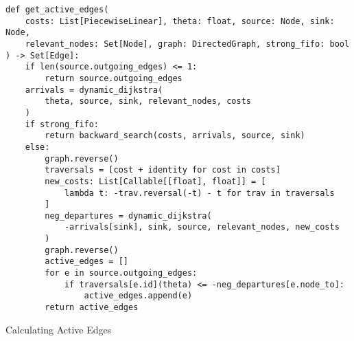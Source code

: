 \begin{algorithm}
    \begin{verbatim}
def get_active_edges(
    costs: List[PiecewiseLinear], theta: float, source: Node, sink: Node,
    relevant_nodes: Set[Node], graph: DirectedGraph, strong_fifo: bool
) -> Set[Edge]:
    if len(source.outgoing_edges) <= 1:
        return source.outgoing_edges
    arrivals = dynamic_dijkstra(
        theta, source, sink, relevant_nodes, costs
    )
    if strong_fifo:
        return backward_search(costs, arrivals, source, sink)
    else:
        graph.reverse()
        traversals = [cost + identity for cost in costs]
        new_costs: List[Callable[[float], float]] = [
            lambda t: -trav.reversal(-t) - t for trav in traversals
        ]
        neg_departures = dynamic_dijkstra(
            -arrivals[sink], sink, source, relevant_nodes, new_costs
        )
        graph.reverse()
        active_edges = []
        for e in source.outgoing_edges:
            if traversals[e.id](theta) <= -neg_departures[e.node_to]:
                active_edges.append(e)
        return active_edges
    \end{verbatim}
    \caption{Calculating Active Edges}
    \label{alg:calculate-active-edges}
\end{algorithm}

\iffalse
{}

